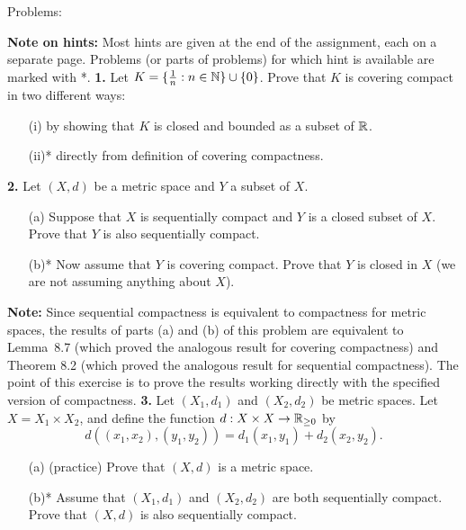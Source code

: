 \documentclass[11pt]{amsart}
\begin{document}
\skv
\bf\centerline{Problems: }\rm
\skv
{\bf Note on hints: } Most hints are given at the end of the assignment, each on a separate page.
Problems (or parts of problems) for which hint is available are marked with *. 
\skv
{\bf 1.} Let $K=\{\frac{1}{n}: n\in{\mathbb N}\}\cup\{0\}$. Prove that $K$ is covering compact in two different ways:
\begin{itemize}
\item[(i)] by showing that $K$ is closed and bounded as a subset of ${\mathbb R}$.
\item[(ii)*] directly from definition of covering compactness.
\end{itemize}
\skv
{\bf 2.} Let $(X,d)$ be a metric space and $Y$ a subset of $X$.
\begin{itemize} 
\item[(a)] Suppose that $X$ is sequentially compact and
$Y$ is a closed subset of $X$. Prove that $Y$ is also sequentially compact.
\item[(b)*] Now assume that $Y$ is covering compact. Prove that
$Y$ is closed in $X$ (we are not assuming anything about $X$).
\end{itemize}
{\bf Note:} Since sequential compactness is equivalent to compactness for
metric spaces, the results of parts (a) and (b) of this problem are equivalent to 
Lemma~8.7 (which proved the analogous result for covering compactness) and Theorem 8.2 (which proved the analogous result
for sequential compactness). The point of this exercise is to prove the results working directly
with the specified version of compactness.
\skv
{\bf 3.}  Let $(X_1,d_1)$ and $(X_2,d_2)$ be metric spaces. Let $X=X_1\times X_2$,
and define the function $d:X\times X\to{\mathbb R}_{\geq 0}$ by
$$d((x_1,x_2),(y_1,y_2))=d_1(x_1,y_1)+d_2(x_2,y_2).$$
\begin{itemize}
\item[(a)] (practice) Prove that $(X,d)$ is a metric space.
\item[(b)*] Assume that $(X_1,d_1)$ and $(X_2,d_2)$ are both sequentially compact.
Prove that $(X,d)$ is also sequentially compact.
\end{itemize}
\end{document}

